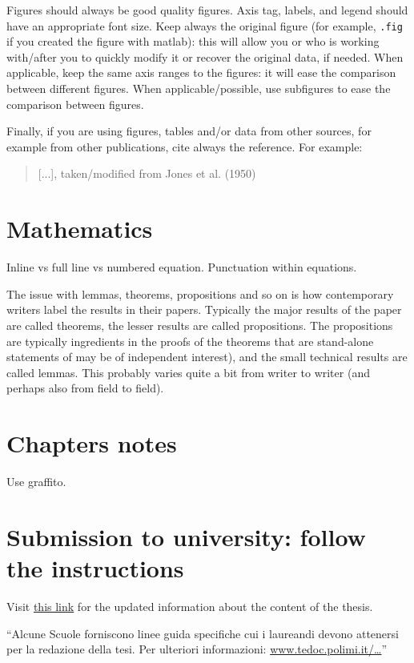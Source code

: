 Figures should always be good quality figures.
Axis tag, labels, and legend should have an appropriate font size.
Keep always the original figure (for example, \verb!.fig! if you created the figure with matlab): this will allow you or who is working with/after you to quickly modify it or recover the original data, if needed.
When applicable, keep the same axis ranges to the figures: it will ease the comparison between different figures.
When applicable/possible, use subfigures to ease the comparison between figures.

Finally, if you are using figures, tables and/or data from other sources, for example from other publications, cite always the reference. 
For example: \\
\blockquote{[...], taken/modified from Jones et al. (1950)}

\section{Mathematics}
Inline vs full line vs numbered equation.
Punctuation within equations.

The issue with lemmas, theorems, propositions and so on is how contemporary writers label the results in their papers.
Typically the major results of the paper are called theorems, the lesser results are called propositions.
The propositions are typically ingredients in the proofs of the theorems that are stand-alone statements of may be of independent interest), and the small technical results are called lemmas.
This probably varies quite a bit from writer to writer (and perhaps also from field to field).

\section{Chapters notes}
Use graffito.

\section{Submission to university: follow the instructions}
Visit \href{http://www.tedoc.polimi.it/tesilaurea/Consegna-tesi-di-laurea-(vecchio-ordinamento-e-specialistica)}{this link} for the updated information about the content of the thesis.

\enquote{Alcune Scuole forniscono linee guida specifiche cui i laureandi devono attenersi per la redazione della tesi. Per ulteriori informazioni:
\href{http://www.tedoc.polimi.it/download/lauree_magistrali/201406_POLITesi_Info_specifiche_scuole.pdf}{www.tedoc.polimi.it/\ldots}}

